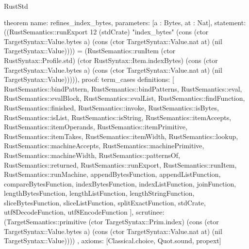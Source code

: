 \begin{lexlean}{RustStd}
\begin{semanticmodule}
theorem{
  name: refines_index_bytes,
  parameters: [a : Bytes, at : Nat],
  statement: ((RustSemantics::runExport 12 (stdCrate) "index_bytes" (cons (ctor TargetSyntax::Value.bytes a) (cons (ctor TargetSyntax::Value.nat at) (nil TargetSyntax::Value)))) = (RustSemantics::runItem (ctor RustSyntax::Profile.std) (ctor RustSyntax::Item.indexBytes) (cons (ctor TargetSyntax::Value.bytes a) (cons (ctor TargetSyntax::Value.nat at) (nil TargetSyntax::Value))))),
  proof: term_cases{
    definitions: [
      RustSemantics::bindPattern,
      RustSemantics::bindPatterns,
      RustSemantics::eval,
      RustSemantics::evalBlock,
      RustSemantics::evalList,
      RustSemantics::findFunction,
      RustSemantics::finished,
      RustSemantics::invoke,
      RustSemantics::isBytes,
      RustSemantics::isList,
      RustSemantics::isString,
      RustSemantics::itemAccepts,
      RustSemantics::itemOperands,
      RustSemantics::itemPrimitive,
      RustSemantics::itemTakes,
      RustSemantics::itemWidth,
      RustSemantics::lookup,
      RustSemantics::machineAccepts,
      RustSemantics::machinePrimitive,
      RustSemantics::machineWidth,
      RustSemantics::patternsOf,
      RustSemantics::returned,
      RustSemantics::runExport,
      RustSemantics::runItem,
      RustSemantics::runMachine,
      appendBytesFunction,
      appendListFunction,
      compareBytesFunction,
      indexBytesFunction,
      indexListFunction,
      joinFunction,
      lengthBytesFunction,
      lengthListFunction,
      lengthStringFunction,
      sliceBytesFunction,
      sliceListFunction,
      splitExactFunction,
      stdCrate,
      utf8DecodeFunction,
      utf8EncodeFunction
    ],
    scrutinee: (TargetSemantics::primitive (ctor TargetSyntax::Prim.index) (cons (ctor TargetSyntax::Value.bytes a) (cons (ctor TargetSyntax::Value.nat at) (nil TargetSyntax::Value))))
  },
  axioms: [Classical.choice, Quot.sound, propext]
}


\end{semanticmodule}
\end{lexlean}
